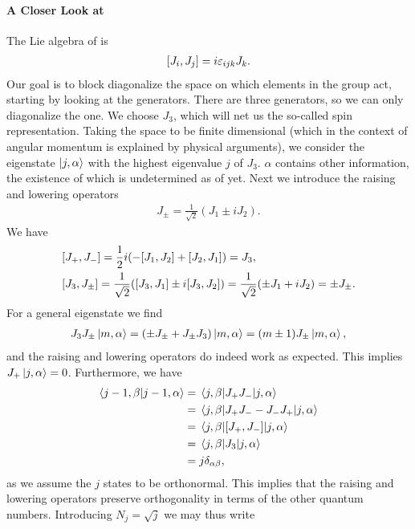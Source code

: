 \paragraph{A Closer Look at }
The Lie algebra of  is
\begin{align*}
	\comm{J_{i}}{J_{j}} = i\varepsilon_{ijk}J_{k}.
\end{align*}
Our goal is to block diagonalize the space on which elements in the group act, starting by looking at the generators. There are three generators, so we can only diagonalize the one. We choose $J_{3}$, which will net us the so-called spin representation. Taking the space to be finite dimensional (which in the context of angular momentum is explained by physical arguments), we consider the eigenstate $\ket{j, \alpha}$ with the highest eigenvalue $j$ of $J_{3}$. $\alpha$ contains other information, the existence of which is undetermined as of yet. Next we introduce the raising and lowering operators
\begin{align*}
	J_{\pm} = \frac{1}{\sqrt{2}}(J_{1} \pm iJ_{2}).
\end{align*}
We have
\begin{align*}
	&\comm{J_{+}}{J_{-}} = \frac{1}{2}i(-\comm{J_{1}}{J_{2}} + \comm{J_{2}}{J_{1}}) = J_{3}, \\
	&\comm{J_{3}}{J_{\pm}} = \frac{1}{\sqrt{2}}(\comm{J_{3}}{J_{1}} \pm i\comm{J_{3}}{J_{2}}) = \frac{1}{\sqrt{2}}(\pm J_{1} + iJ_{2}) = \pm J_{\pm}.
\end{align*}
For a general eigenstate we find
\begin{align*}
	J_{3}J_{\pm}\ket{m, \alpha} = (\pm J_{\pm} + J_{\pm}J_{3})\ket{m, \alpha} = (m \pm 1)J_{\pm}\ket{m, \alpha},
\end{align*}
and the raising and lowering operators do indeed work as expected. This implies $J_{+}\ket{j, \alpha} = 0$. Furthermore, we have
\begin{align*}
	\braket{j - 1, \beta}{j - 1, \alpha} &= \mel{j, \beta}{J_{+}J_{-}}{j, \alpha} \\
	                                     &= \mel{j, \beta}{J_{+}J_{-} - J_{-}J_{+}}{j, \alpha} \\
	                                     &= \mel{j, \beta}{\comm{J_{+}}{J_{-}}}{j, \alpha} \\
	                                     &= \mel{j, \beta}{J_{3}}{j, \alpha} \\
	                                     &= j\delta_{\alpha\beta},
\end{align*}
as we assume the $j$ states to be orthonormal. This implies that the raising and lowering operators preserve orthogonality in terms of the other quantum numbers. Introducing $N_{j} = \sqrt{j}$ we may thus write

